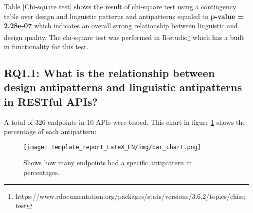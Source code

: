 \documentclass[a4paper,12pt]{article}
\begin{document}
Table \ref{Chi-square test} shows the result of chi-square test using a contingency table over design and linguistic patterns and antipatterns equaled to \textbf{p-value = 2.28e-07} which indicates an overall strong relationship between linguistic and design quality. The chi-square test was performed in R-studio\footnote{https://www.rdocumentation.org/packages/stats/versions/3.6.2/topics/chisq.test} which has a built in functionality for this test. 

\clearpage

\subsection{\textbf{RQ1.1:} What is the relationship between design antipatterns and linguistic antipatterns in RESTful APIs?}

A total of 326 endpoints in 10 APIs were tested. This chart in figure \ref{fig:barchart} shows the percentage of each antipattern:

\begin{figure}[!h]
\begin{center}
\texttt{[image: Template\_report\_LaTeX\_EN/img/bar\_chart.png]}
\caption{Shows how many endpoints had a specific antipattern in percentages.}
\label{fig:barchart}
\end{center}
\end{figure}
\end{document}
